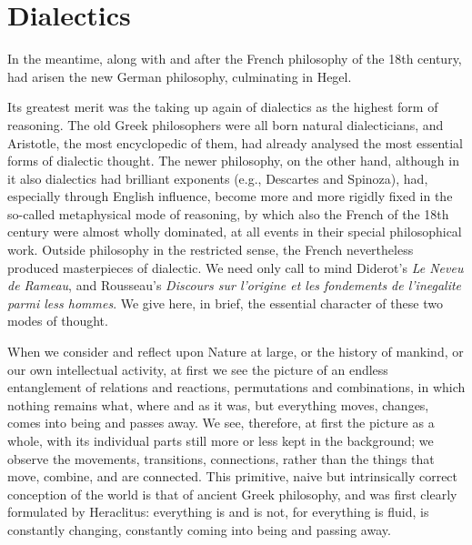 \chapter{Dialectics}

In the meantime, along with and after the French philosophy of the 18th century,
had arisen the new German philosophy, culminating in Hegel.

Its greatest merit was the taking up again of dialectics as the highest form of
reasoning. The old Greek philosophers were all born natural dialecticians, and
Aristotle, the most encyclopedic of them, had already analysed the most essential
forms of dialectic thought. The newer philosophy, on the other hand, although in
it also dialectics had brilliant exponents (e.g., Descartes and Spinoza), had,
especially through English influence, become more and more rigidly fixed in the
so-called metaphysical mode of reasoning, by which also the French of the 18th
century were almost wholly dominated, at all events in their special
philosophical work. Outside philosophy in the restricted sense, the French
nevertheless produced masterpieces of dialectic. We need only call to mind
Diderot's \emph{Le Neveu de Rameau}, and Rousseau's \emph{Discours sur l'origine
et les fondements de l'inegalite parmi less hommes}. We give here, in brief, the
essential character of these two modes of thought.

When we consider and reflect upon Nature at large, or the history of mankind, or
our own intellectual activity, at first we see the picture of an endless
entanglement of relations and reactions, permutations and combinations, in which
nothing remains what, where and as it was, but everything moves, changes, comes
into being and passes away. We see, therefore, at first the picture as a whole,
with its individual parts still more or less kept in the background; we observe
the movements, transitions, connections, rather than the things that move,
combine, and are connected. This primitive, naive but intrinsically correct
conception of the world is that of ancient Greek philosophy, and was first
clearly formulated by Heraclitus: everything is and is not, for everything is
fluid, is constantly changing, constantly coming into being and passing
away.

